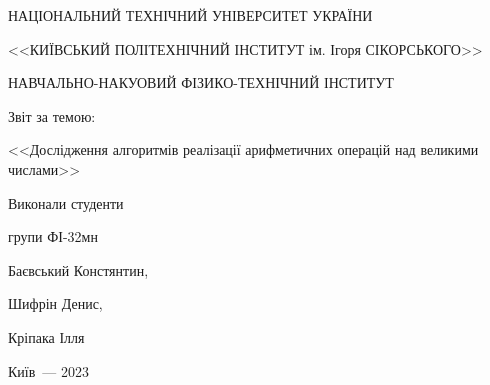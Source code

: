 
	\thispagestyle{empty}
	
	\begin{center}
		НАЦІОНАЛЬНИЙ ТЕХНІЧНИЙ УНІВЕРСИТЕТ УКРАЇНИ \par
		<<КИЇВСЬКИЙ ПОЛІТЕХНІЧНИЙ ІНСТИТУТ ім. Ігоря СІКОРСЬКОГО>>\par
		НАВЧАЛЬНО-НАКУОВИЙ ФІЗИКО-ТЕХНІЧНИЙ ІНСТИТУТ\par
		
		\vspace{60mm}
		{\huge Звіт за темою:\par
			\LARGE <<Дослідження алгоритмів реалізації арифметичних операцій
			 над великими числами>>\par}
		
	\end{center}
	
	\vspace{40mm}
	\begin{flushright}
		Виконали студенти
		
		групи ФІ-32мн
		
		Баєвський Констянтин,
		
		Шифрін Денис,
		
		Кріпака Ілля
		
	\end{flushright}
	
	\vspace{27mm}
	\begin{center}
		{Київ~--- 2023}
	\end{center}
	
